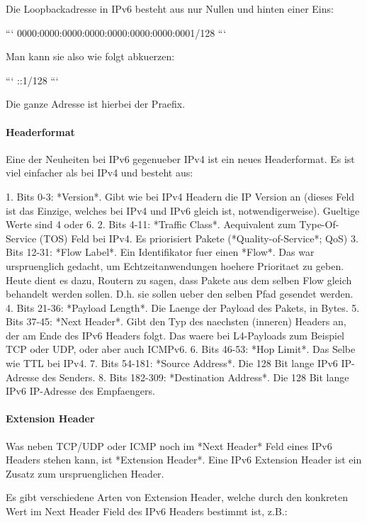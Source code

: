 Die Loopbackadresse in IPv6 besteht aus nur Nullen und hinten einer Eins:

```
0000:0000:0000:0000:0000:0000:0000:0001/128
```

Man kann sie also wie folgt abkuerzen:

```
::1/128
```

Die ganze Adresse ist hierbei der Praefix.

\paragraph{Headerformat} 

Eine der Neuheiten bei IPv6 gegenueber IPv4 ist ein neues Headerformat. Es ist
viel einfacher als bei IPv4 und besteht aus:

1. Bits 0-3: *Version*. Gibt wie bei IPv4 Headern die IP Version an (dieses Feld
   ist das Einzige, welches bei IPv4 und IPv6 gleich ist,
   notwendigerweise). Gueltige Werte sind 4 oder 6.
2. Bits 4-11: *Traffic Class*. Aequivalent zum Type-Of-Service (TOS) Feld bei
   IPv4. Es priorisiert Pakete (*Quality-of-Service*; QoS)
3. Bits 12-31: *Flow Label*. Ein Identifikator fuer einen *Flow*. Das war
   urspruenglich gedacht, um Echtzeitanwendungen hoehere Prioritaet zu
   geben. Heute dient es dazu, Routern zu sagen, dass Pakete aus dem selben Flow
   gleich behandelt werden sollen. D.h. sie sollen ueber den selben Pfad gesendet
   werden.
4. Bits 21-36: *Payload Length*. Die Laenge der Payload des Pakets, in Bytes.
5. Bits 37-45: *Next Header*. Gibt den Typ des naechsten (inneren) Headers an,
   der am Ende des IPv6 Headers folgt. Das waere bei L4-Payloads zum Beispiel
   TCP oder UDP, oder aber auch ICMPv6.
6. Bits 46-53: *Hop Limit*. Das Selbe wie TTL bei IPv4.
7. Bits 54-181: *Source Address*. Die 128 Bit lange IPv6 IP-Adresse des Senders.
8. Bits 182-309: *Destination Address*. Die 128 Bit lange IPv6 IP-Adresse des Empfaengers.

\paragraph{Extension Header} 

Was neben TCP/UDP oder ICMP noch im *Next Header* Feld eines IPv6 Headers stehen
kann, ist *Extension Header*. Eine IPv6 Extension Header ist ein Zusatz zum
urspruenglichen Header.

Es gibt verschiedene Arten von Extension Header, welche durch den konkreten Wert
im Next Header Field des IPv6 Headers bestimmt ist, z.B.:

